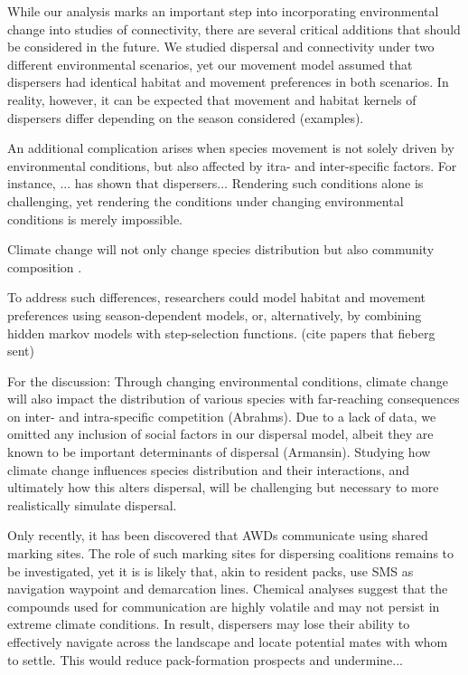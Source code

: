 \documentclass[abstract=on,10pt,a4paper,bibliography=totocnumbered]{article}
\begin{document}
While our analysis marks an important step into incorporating environmental
change into studies of connectivity, there are several critical additions that
should be considered in the future. We studied dispersal and connectivity under
two different environmental scenarios, yet our movement model assumed that
dispersers had identical habitat and movement preferences in both scenarios. In
reality, however, it can be expected that movement and habitat kernels of
dispersers differ depending on the season considered (examples).

An additional complication arises when species movement is not solely driven by
environmental conditions, but also affected by itra- and inter-specific factors.
For instance, ... has shown that dispersers...
Rendering such conditions alone is challenging, yet rendering the conditions
under changing environmental conditions is merely impossible.

Climate change will not only change species distribution but also community
composition \citep{Thuiller.2006}.

To address such differences, researchers could model
habitat and movement preferences using season-dependent models, or,
alternatively, by combining hidden markov models with step-selection functions.
(cite papers that fieberg sent)

For the discussion: Through changing environmental conditions, climate change
will also impact the distribution of various species with far-reaching
consequences on inter- and intra-specific competition (Abrahms). Due to a lack
of data, we omitted any inclusion of social factors in our dispersal model,
albeit they are known to be important determinants of dispersal (Armansin).
Studying how climate change influences species distribution and their
interactions, and ultimately how this alters dispersal, will be challenging but
necessary to more realistically simulate dispersal.


Only recently, it has been discovered that AWDs communicate using shared marking
sites. The role of such marking sites for dispersing coalitions remains to be
investigated, yet it is is likely that, akin to resident packs, use SMS as
navigation waypoint and demarcation lines. Chemical analyses suggest that the
compounds used for communication are highly volatile and may not persist in
extreme climate conditions. In result, dispersers may lose their ability to
effectively navigate across the landscape and locate potential mates with whom
to settle. This would reduce pack-formation prospects and undermine...
\end{document}
